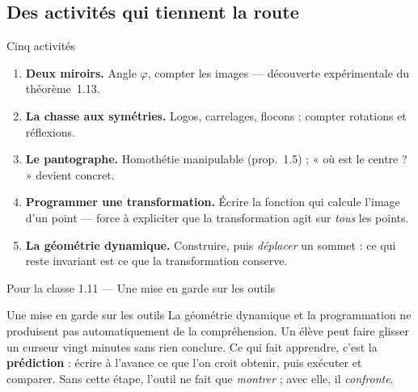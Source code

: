 \subsection{Des activités qui tiennent la route}
\begin{frame}{Cinq activités}
  \begin{enumerate}
    \item \textbf{Deux miroirs.} Angle $\varphi$, compter les images ---
      découverte expérimentale du théorème~1.13.
    \item \textbf{La chasse aux symétries.} Logos, carrelages,
      flocons : compter rotations et réflexions.
    \item \textbf{Le pantographe.} Homothétie manipulable (prop.~1.5) ;
      « où est le centre ? » devient concret.
    \item \textbf{Programmer une transformation.} Écrire la fonction
      qui calcule l'image d'un point --- force à expliciter que la
      transformation agit sur \emph{tous} les points.
    \item \textbf{La géométrie dynamique.} Construire, puis
      \emph{déplacer} un sommet : ce qui reste invariant est ce que la
      transformation conserve.
  \end{enumerate}
\end{frame}

\begin{frame}{Pour la classe 1.11 --- Une mise en garde sur les outils}
  \begin{Classe}{Une mise en garde sur les outils}
    \small La géométrie dynamique et la programmation ne produisent
    pas automatiquement de la compréhension. Un élève peut faire
    glisser un curseur vingt minutes sans rien conclure. Ce qui fait
    apprendre, c'est la \textbf{prédiction} : écrire à l'avance ce que
    l'on croit obtenir, puis exécuter et comparer. Sans cette étape,
    l'outil ne fait que \emph{montrer} ; avec elle, il
    \emph{confronte}.
  \end{Classe}
\end{frame}
